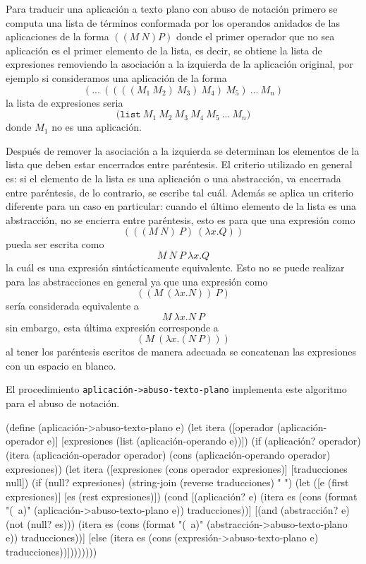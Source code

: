 Para traducir una aplicación a texto plano con abuso de notación primero se computa una lista de términos conformada por los operandos anidados de las aplicaciones de la forma \( ((M\ N) P) \) donde el primer operador que no sea aplicación es el primer elemento de la lista, es decir, se obtiene la lista de expresiones removiendo la asociación a la izquierda de la aplicación original, por ejemplo si consideramos una aplicación de la forma\[ (...\ ((((M_{1}\ M_{2})\ M_{3})\ M_{4})\ M_{5})\ ...\ M_{n}) \]la lista de expresiones seria\[ \mathtt{(list}\ M_{1}\ M_{2}\ M_{3}\ M_{4}\ M_{5}\ ...\ M_{n} \mathtt{)} \]donde \( M_{1} \) no es una aplicación.

Después de remover la asociación a la izquierda se determinan los elementos de la lista que deben estar encerrados entre paréntesis. El criterio utilizado en general es: si el elemento de la lista es una aplicación o una abstracción, va encerrada entre paréntesis, de lo contrario, se escribe tal cuál. Además se aplica un criterio diferente para un caso en particular: cuando el último elemento de la lista es una abstracción, no se encierra entre paréntesis, esto es para que una expresión como\[ (((M\ N)\ P)\ (λx.Q)) \]pueda ser escrita como\[ M\ N\ P\ λx.Q \]la cuál es una expresión sintácticamente equivalente. Esto no se puede realizar para las abstracciones en general ya que una expresión como\[ ((M\ (λx.N))\ P) \]sería considerada equivalente a\[ M\ λx.N\ P \]sin embargo, esta última expresión corresponde a\[ (M\ (λx.(N\ P))) \]al tener los paréntesis escritos de manera adecuada se concatenan las expresiones con un espacio en blanco.

El procedimiento {\tt{}\protect{}aplicación\protect{}->abuso-texto-plano} implementa este algoritmo para el abuso de notación.

\nwenddocs{}\plusendmoddef
(define (aplicación->abuso-texto-plano e)
  (let itera ([operador    (aplicación-operador e)]
              [expresiones (list (aplicación-operando e))])
    (if (aplicación? operador)
        (itera (aplicación-operador operador)
               (cons (aplicación-operando operador) expresiones))
        (let itera ([expresiones  (cons operador expresiones)]
                    [traducciones null])
          (if (null? expresiones)
              (string-join (reverse traducciones) " ")
              (let ([e  (first expresiones)]
                    [es (rest  expresiones)])
                (cond
                 [(aplicación? e)
                  (itera es (cons (format "(~a)" (aplicación->abuso-texto-plano e))
                                  traducciones))]
                 [(and (abstracción? e) (not (null? es)))
                  (itera es (cons (format "(~a)" (abstracción->abuso-texto-plano e))
                                  traducciones))]
                 [else
                  (itera es (cons (expresión->abuso-texto-plano e)
                                  traducciones))])))))))

